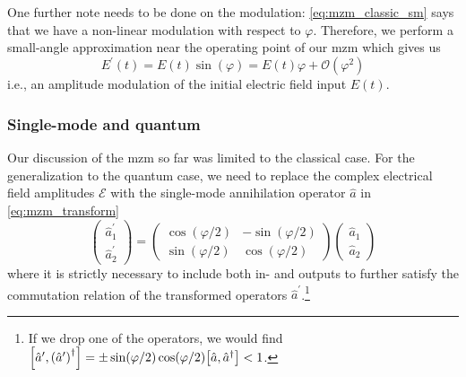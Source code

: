 One further note needs to be done on the modulation: \cref{eq:mzm_classic_sm} says that we have a non-linear modulation with respect to $\varphi$.
Therefore, we perform a small-angle approximation near the operating point of our \gls{mzm} which gives us
\begin{equation}
    E^\prime(t)
    =
    E(t)\sin(\varphi)
    =
    E(t)\varphi+\mathcal{O}(\varphi^2)
\end{equation}
i.e., an amplitude modulation of the initial electric field input $E(t)$.

\subsubsection{Single-mode and quantum}

Our discussion of the \gls{mzm} so far was limited to the classical case.
For the generalization to the quantum case, we need to replace the complex electrical field amplitudes $\mathcal{E}$ with the single-mode annihilation operator $\hat{a}$ in \cref{eq:mzm_transform}
\begin{equation}
    \begin{pmatrix}
        \hat{a}_1^\prime
        \\
        \hat{a}_2^\prime
    \end{pmatrix}
    =
    \begin{pmatrix}
        \cos(\varphi/2) & -\sin(\varphi/2)
        \\
        \sin(\varphi/2) & \cos(\varphi/2)
    \end{pmatrix}
    \begin{pmatrix}
        \hat{a}_1
        \\
        \hat{a}_2
    \end{pmatrix}
    \label{eq:mzm_operator_transform_sm}
\end{equation}
where it is strictly necessary to include both in- and outputs to further satisfy the commutation relation of the transformed operators $\hat{a}^\prime$.\footnote{If we drop one of the operators, we would find $\comm{\hat{a}^\prime}{\left(\hat{a}^\prime\right)^\dagger}=\pm\sin(\varphi/2)\cos(\varphi/2)\comm{\hat{a}}{\hat{a}^\dagger}<1$.}

